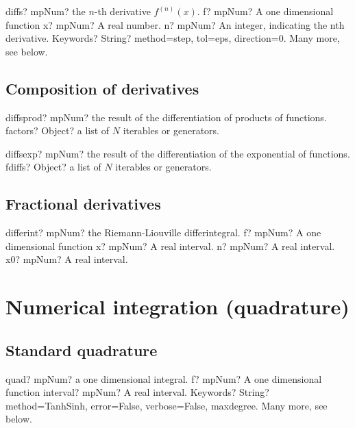 \documentclass[12pt,a4paper,openany]{book}
\begin{document}
\begin{mpFunctionsExtract}
\mpFunctionFour
{diffs? mpNum? the $n$-th derivative $f^{(n)}(x)$.}
{f? mpNum? A one dimensional function}
{x? mpNum? A real number.}
{n? mpNum? An integer, indicating the nth derivative.}
{Keywords? String? method=step, tol=eps, direction=0. Many more, see below.}
\end{mpFunctionsExtract}

\section{Composition of derivatives}

\begin{mpFunctionsExtract}
\mpFunctionOne
{diffsprod? mpNum? the result of the differentiation of products of functions.}
{factors? Object? a list of $N$ iterables or generators.}
\end{mpFunctionsExtract}

\begin{mpFunctionsExtract}
\mpFunctionOne
{diffsexp? mpNum? the result of the differentiation of the exponential of functions.}
{fdiffs? Object? a list of $N$ iterables or generators.}
\end{mpFunctionsExtract}

\section{Fractional derivatives}

\begin{mpFunctionsExtract}
\mpFunctionFour
{differint? mpNum? the Riemann-Liouville differintegral.}
{f? mpNum? A one dimensional function}
{x? mpNum? A real interval.}
{n? mpNum? A real interval.}
{x0? mpNum? A real interval.}
\end{mpFunctionsExtract}

\chapter{Numerical integration (quadrature)}

\section{Standard quadrature}

\begin{mpFunctionsExtract}
\mpFunctionThree
{quad? mpNum? a one dimensional integral.}
{f? mpNum? A one dimensional function}
{interval? mpNum? A real interval.}
{Keywords? String? method=TanhSinh, error=False, verbose=False, maxdegree. Many more, see below.}
\end{mpFunctionsExtract}
\end{document}
